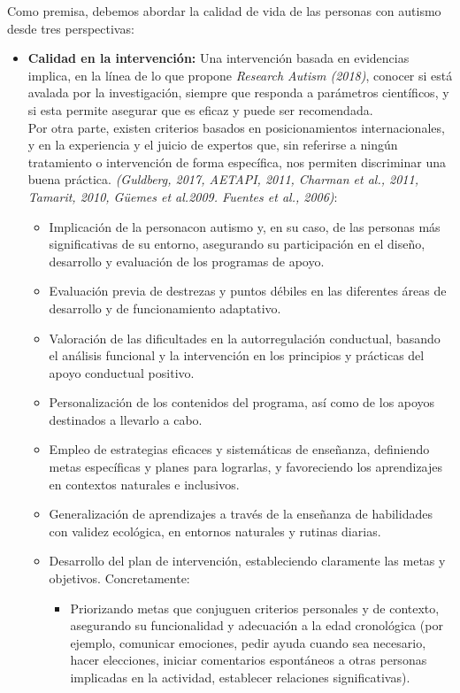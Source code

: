 Como premisa, debemos abordar la calidad de vida de las personas con autismo desde tres perspectivas:
\begin{itemize}
	\item \textbf{Calidad en la intervención: }Una intervención basada en evidencias implica, en la línea de lo que propone
	\textit{Research Autism (2018)}, conocer si está avalada por la investigación, siempre
	que responda a parámetros científicos, y si esta permite asegurar que es eficaz
	y puede ser recomendada. \\
	
	Por otra parte, existen criterios basados en posicionamientos internacionales, y
	en la experiencia y el juicio de expertos que, sin referirse a ningún
	tratamiento o intervención de forma específica, nos permiten discriminar una
	buena práctica. \textit{(Guldberg, 2017, AETAPI, 2011, Charman et al., 2011, Tamarit,
	2010, Güemes et al.2009. Fuentes et al., 2006)}:
	\begin{itemize}
		\item Implicación de la personacon autismo y, en su caso, de las personas más significativas de su entorno, asegurando su participación en el diseño, desarrollo y evaluación de los programas de apoyo.  
		\item Evaluación previa de destrezas y puntos débiles en las diferentes áreas de desarrollo y de funcionamiento adaptativo.
		\item Valoración de las dificultades en la autorregulación conductual, basando el análisis funcional y la intervención en los principios y prácticas del apoyo conductual positivo.
		\item Personalización de los contenidos del programa, así como de los apoyos destinados a llevarlo a cabo. 
		\item Empleo de estrategias eficaces y sistemáticas de enseñanza, definiendo metas específicas y planes para lograrlas, y favoreciendo los aprendizajes en contextos naturales e inclusivos.  
		\item Generalización de aprendizajes a través de la enseñanza de habilidades con validez ecológica, en entornos naturales y rutinas diarias. 
		\item Desarrollo del plan de intervención, estableciendo claramente las metas y objetivos. Concretamente:  
		\begin{itemize}
			\item Priorizando metas que conjuguen criterios personales y de contexto, asegurando su funcionalidad y adecuación a la edad cronológica (por ejemplo, comunicar emociones, pedir ayuda cuando sea necesario, hacer elecciones, iniciar comentarios espontáneos a otras personas implicadas en la actividad, establecer relaciones significativas). 

\end{itemize}
\end{itemize}
\end{itemize}
